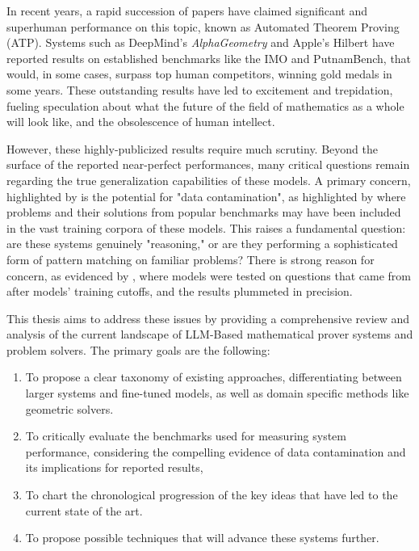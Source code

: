 \documentclass[12pt, letterpaper]{article}
\begin{document}
In recent years, a rapid succession of papers have claimed significant and superhuman performance on this topic, known as Automated Theorem Proving (ATP). Systems such as DeepMind's \textit{AlphaGeometry} \citep{chervonyi2025goldmedalistperformancesolvingolympiad} and Apple's Hilbert \citep{varambally2025hilbertrecursivelybuildingformal} have reported results on established benchmarks like the IMO and PutnamBench, that would, in some cases, surpass top human competitors, winning gold medals in some years. These outstanding results have led to excitement and trepidation, fueling speculation about what the future of the field of mathematics as a whole will look like, and the obsolescence of human intellect.

However, these highly-publicized results require much scrutiny. Beyond the surface of the reported near-perfect performances, many critical questions remain regarding the true generalization capabilities of these models. A primary concern, highlighted by \citet{khatibi2025eefsuvanewmathematicalolympiad} is the potential for "data contamination", as highlighted by \citet{balunovic2025matharena} where problems and their solutions from popular benchmarks may have been included in the vast training corpora of these models. This raises a fundamental question: are these systems genuinely "reasoning," or are they performing a sophisticated form of pattern matching on familiar problems? There is strong reason for concern, as evidenced by \citet{balunovic2025matharena}, where models were tested on questions that came from after models' training cutoffs, and the results plummeted in precision.

This thesis aims to address these issues by providing a comprehensive review and analysis of the current landscape of LLM-Based mathematical prover systems and problem solvers. The primary goals are the following:
\begin{enumerate}
    \item To propose a clear taxonomy of existing approaches, differentiating between larger systems and fine-tuned models, as well as domain specific methods like geometric solvers.
    \item To critically evaluate the benchmarks used for measuring system performance, considering the compelling evidence of data contamination and its implications for reported results,
    \item To chart the chronological progression of the key ideas that have led to the current state of the art.
    \item To propose possible techniques that will advance these systems further.
\end{enumerate}
\end{document}
